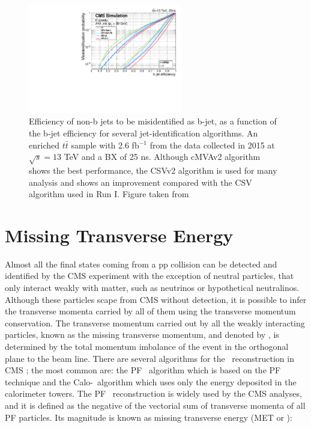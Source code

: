 \begin{figure}[ht]%
  \begin{center}
    \includegraphics[width=0.6\textwidth]{figuras/Chapter3/bjet_performance_algos.pdf}
    \caption{Efficiency of non-b jets to be misidentified as b-jet, as a function of the b-jet efficiency 
	     for several jet-identification algorithms. An enriched $t\bar{t}$ sample with 2.6 fb$^{-1}$ 
	     from the data collected in 2015 at $\sqrt{s}=13$ TeV and a BX of 25 ns. Although cMVAv2 algorithm 
             shows the best performance, the CSVv2 algorithm is used for many analysis and shows 
             an improvement compared with the CSV algorithm used in Run I. Figure taken from \cite{bjetWP}}
    \label{fig:bjetRun1vsRun2}
  \end{center}
\end{figure}


\section{Missing Transverse Energy}
\label{sec:MET}

Almost all the final states coming from a pp collision 
can be detected and identified by the CMS experiment
with the exception of neutral particles, that only interact
weakly with matter, such as neutrinos or hypothetical 
neutralinos. Although these particles scape from CMS without detection, it is possible 
to infer the transverse momenta carried by all of them using the 
transverse momentum conservation. The transverse momentum carried 
out by all the weakly interacting particles, known as the missing 
transverse momentum, and denoted by \METv, is determined by the total 
momentum imbalance of the event in the orthogonal plane to the beam 
line. There are several algorithms for the \METv~reconstruction 
in CMS \cite{METPerformance}; the most common are: the PF \METv~algorithm 
which is based on the PF technique  and the Calo-\METv~algorithm which uses only
the energy deposited in the calorimeter towers. The PF \METv~reconstruction is widely 
used by the CMS analyses, and it is defined as the negative of the 
vectorial sum of transverse momenta of all PF particles. Its 
magnitude is known as missing transverse energy (MET or \MET):

